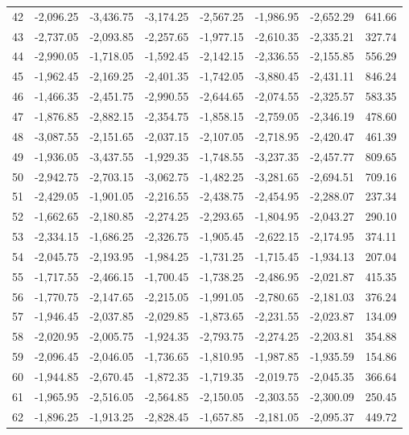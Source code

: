 \begin{longtable}{rrrrrrrr}
42 & -2,096.25 & -3,436.75 & -3,174.25 & -2,567.25 & -1,986.95 & -2,652.29 & 641.66  \\
43 & -2,737.05 & -2,093.85 & -2,257.65 & -1,977.15 & -2,610.35 & -2,335.21 & 327.74  \\
44 & -2,990.05 & -1,718.05 & -1,592.45 & -2,142.15 & -2,336.55 & -2,155.85 & 556.29  \\
45 & -1,962.45 & -2,169.25 & -2,401.35 & -1,742.05 & -3,880.45 & -2,431.11 & 846.24  \\
46 & -1,466.35 & -2,451.75 & -2,990.55 & -2,644.65 & -2,074.55 & -2,325.57 & 583.35  \\
47 & -1,876.85 & -2,882.15 & -2,354.75 & -1,858.15 & -2,759.05 & -2,346.19 & 478.60  \\
48 & -3,087.55 & -2,151.65 & -2,037.15 & -2,107.05 & -2,718.95 & -2,420.47 & 461.39  \\
49 & -1,936.05 & -3,437.55 & -1,929.35 & -1,748.55 & -3,237.35 & -2,457.77 & 809.65  \\
50 & -2,942.75 & -2,703.15 & -3,062.75 & -1,482.25 & -3,281.65 & -2,694.51 & 709.16  \\
51 & -2,429.05 & -1,901.05 & -2,216.55 & -2,438.75 & -2,454.95 & -2,288.07 & 237.34  \\
52 & -1,662.65 & -2,180.85 & -2,274.25 & -2,293.65 & -1,804.95 & -2,043.27 & 290.10  \\
53 & -2,334.15 & -1,686.25 & -2,326.75 & -1,905.45 & -2,622.15 & -2,174.95 & 374.11  \\
54 & -2,045.75 & -2,193.95 & -1,984.25 & -1,731.25 & -1,715.45 & -1,934.13 & 207.04  \\
55 & -1,717.55 & -2,466.15 & -1,700.45 & -1,738.25 & -2,486.95 & -2,021.87 & 415.35  \\
56 & -1,770.75 & -2,147.65 & -2,215.05 & -1,991.05 & -2,780.65 & -2,181.03 & 376.24  \\
57 & -1,946.45 & -2,037.85 & -2,029.85 & -1,873.65 & -2,231.55 & -2,023.87 & 134.09  \\
58 & -2,020.95 & -2,005.75 & -1,924.35 & -2,793.75 & -2,274.25 & -2,203.81 & 354.88  \\
59 & -2,096.45 & -2,046.05 & -1,736.65 & -1,810.95 & -1,987.85 & -1,935.59 & 154.86  \\
60 & -1,944.85 & -2,670.45 & -1,872.35 & -1,719.35 & -2,019.75 & -2,045.35 & 366.64  \\
61 & -1,965.95 & -2,516.05 & -2,564.85 & -2,150.05 & -2,303.55 & -2,300.09 & 250.45  \\
62 & -1,896.25 & -1,913.25 & -2,828.45 & -1,657.85 & -2,181.05 & -2,095.37 & 449.72  \\

\end{longtable}
